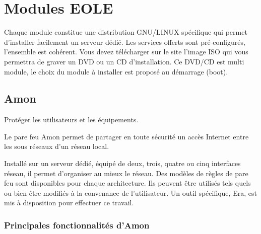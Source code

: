 \section{Modules EOLE}\label{modules eole}

Chaque module constitue une distribution GNU/LINUX spécifique qui permet
d’installer facilement un serveur dédié. Les services offerts sont
pré-configurés, l’ensemble est cohérent. Vous devez télécharger sur le site
l’image ISO qui vous permettra de graver un DVD ou un CD d’installation. Ce
DVD/CD est multi module, le choix du module à installer est proposé au
démarrage (boot). 

\subsection{Amon}

Protéger les utilisateurs et les équipements.

Le pare feu Amon permet de partager en toute sécurité un accès Internet 
entre les sous réseaux d'un réseau local.

Installé sur un serveur dédié, équipé de deux, trois, quatre ou cinq 
interfaces réseau, il permet d'organiser au mieux le réseau.
Des modèles de règles de pare feu sont disponibles pour chaque architecture.
Ils peuvent être utilisés tels quels ou bien être modifiés à la convenance de
l'utilisateur.  Un outil spécifique, Era, est mis à disposition pour effectuer ce
travail.

\subsubsection{Principales fonctionnalités d'Amon}

